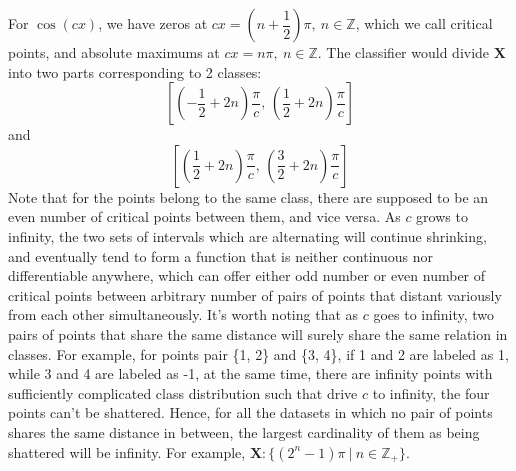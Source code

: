\documentclass[12pt]{article}
\begin{document}
\begin{enumerate}
\begin{enumerate}
    For $\cos(cx)$, we have zeros at 
    $cx = (n + \dfrac{1}{2})\pi,\:n\in\mathbb{Z}$, which we call critical points, and absolute maximums at $cx = n\pi,\:n\in\mathbb{Z}$. The classifier would divide $\textbf{X}$ into two parts corresponding to 2 classes:\[\left[\left(-\dfrac{1}{2} + 2n\right)\frac{\pi}{c},\, \left(\dfrac{1}{2} + 2n\right)\frac{\pi}{c}\right]\] and \[\left[\left(\dfrac{1}{2} + 2n\right)\frac{\pi}{c},\, \left(\dfrac{3}{2} + 2n\right)\frac{\pi}{c}\right]\]
    Note that for the points belong to the same class, there are supposed to be an even number of critical points between them, and vice versa. As $c$ grows to infinity, the two sets of intervals which are alternating will continue shrinking, and eventually tend to form a function that is neither continuous nor differentiable anywhere, which can offer either odd number or even number of critical points between arbitrary number of pairs of points that distant variously from each other simultaneously. It's worth noting that as $c$ goes to infinity, two pairs of points that share the same distance will surely share the same relation in classes. For example, for points pair \{1, 2\} and \{3, 4\}, if 1 and 2 are labeled as 1, while 3 and 4 are labeled as -1, at the same time, there are infinity points with sufficiently complicated class distribution such that drive $c$ to infinity, the four points can't be shattered. Hence, for all the datasets in which no pair of points shares the same distance in between, the largest cardinality of them as being shattered will be infinity. For example, $\textbf{X}: \{(2^n-1)\pi\:|\:n\in\mathbb{Z}_+\}$.
\end{enumerate}
\end{enumerate}
\newpage
\end{document}
